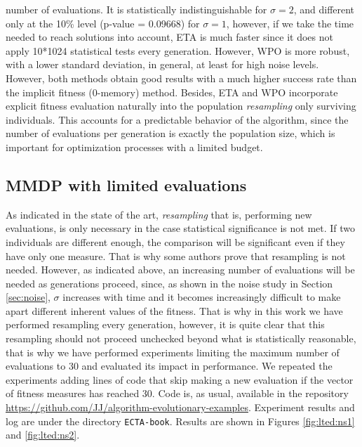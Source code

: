 \documentclass{llncs}
\begin{document}
number of evaluations. It is statistically indistinguishable for
$\sigma=2$, and different only at the 10\% level (p-value = 0.09668)
for $\sigma=1$, however, if we take the time needed to reach solutions
into account, ETA is much faster since it does not apply 10*1024
statistical tests every generation. 
However, WPO is more robust, with
a lower standard deviation, in general, at least for high noise
levels. However, both methods obtain good results with a much higher
success rate than the implicit fitness (0-memory) method. Besides, ETA and WPO 
incorporate explicit fitness evaluation naturally into the population
{\em resampling} only surviving individuals. This accounts for a
predictable behavior of the algorithm, since the number of evaluations
per generation is exactly the population size, which is important for
optimization processes with a limited budget. 

\subsection{MMDP with limited evaluations}
\label{ss:lted}

As indicated in the state of the art, {\em resampling} that is,
performing new evaluations, is only necessary in the case statistical
significance is not met. If two individuals are different enough, the
comparison will be significant even if they have only one
measure. That is why some authors \cite{Qian:sampling} prove that
resampling is not needed. However, as indicated above, an increasing
number of evaluations will be needed as generations proceed, since, as
shown in the noise study in Section \ref{sec:noise}, $\sigma$
increases with time and it becomes increasingly difficult to make
apart different inherent values of the fitness. That is why in this
work we have performed resampling every generation, however, it is
quite clear that this resampling should not proceed unchecked beyond
what is statistically reasonable, that is why we have performed
experiments limiting the maximum number of evaluations to 30 and
evaluated its impact in performance. We repeated the experiments
adding lines of code that skip making a new evaluation if the vector
of fitness measures has reached 30. Code is, as usual, available in
the repository
\url{https://github.com/JJ/algorithm-evolutionary-examples}. Experiment
results and log are under the directory {\tt ECTA-book}. Results are
shown in Figures \ref{fig:lted:ns1} and \ref{fig:lted:ns2}. 
\end{document}
